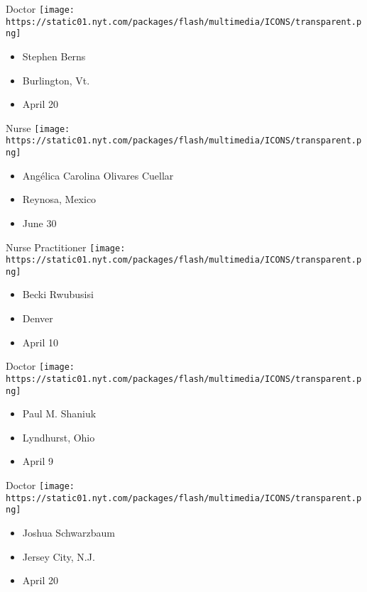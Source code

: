 \protect\hyperlink{item-stephen-berns}{}

Doctor
\texttt{[image: https://static01.nyt.com/packages/flash/multimedia/ICONS/transparent.png]}

\begin{itemize}
\tightlist
\item
  Stephen Berns
\item
  Burlington, Vt.
\item
  April 20
\end{itemize}

\protect\hyperlink{item-angelica-carolina-olivares-cuellar}{}

Nurse
\texttt{[image: https://static01.nyt.com/packages/flash/multimedia/ICONS/transparent.png]}

\begin{itemize}
\tightlist
\item
  Angélica Carolina Olivares Cuellar
\item
  Reynosa, Mexico
\item
  June 30
\end{itemize}

\protect\hyperlink{item-becki-rwubusisi}{}

Nurse Practitioner
\texttt{[image: https://static01.nyt.com/packages/flash/multimedia/ICONS/transparent.png]}

\begin{itemize}
\tightlist
\item
  Becki Rwubusisi
\item
  Denver
\item
  April 10
\end{itemize}

\protect\hyperlink{item-paul-m-shaniuk}{}

Doctor
\texttt{[image: https://static01.nyt.com/packages/flash/multimedia/ICONS/transparent.png]}

\begin{itemize}
\tightlist
\item
  Paul M. Shaniuk
\item
  Lyndhurst, Ohio
\item
  April 9
\end{itemize}

\protect\hyperlink{item-joshua-schwarzbaum}{}

Doctor
\texttt{[image: https://static01.nyt.com/packages/flash/multimedia/ICONS/transparent.png]}

\begin{itemize}
\tightlist
\item
  Joshua Schwarzbaum
\item
  Jersey City, N.J.
\item
  April 20
\end{itemize}


